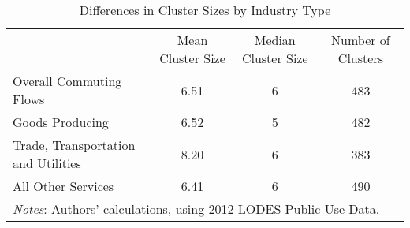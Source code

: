 
\begin{table}
\caption{Differences in Cluster Sizes by Industry Type \label{tab:industrystats}}
\begin{tabular}{lccc}
\hline\hline
       & Mean Cluster Size &  Median Cluster Size & Number of Clusters \\
Overall Commuting Flows &  6.51  & 6 & 483 \\
Goods Producing & 6.52 & 5 & 482 \\
Trade, Transportation and Utilities & 8.20 & 6 & 383  \\
All Other Services & 6.41 &  6 & 490 \\
\hline
\multicolumn{4}{p{6.1in}}{\footnotesize \textit{Notes}: Authors' calculations, using 2012 LODES Public Use Data.}\\
\end{tabular}
\end{table}
